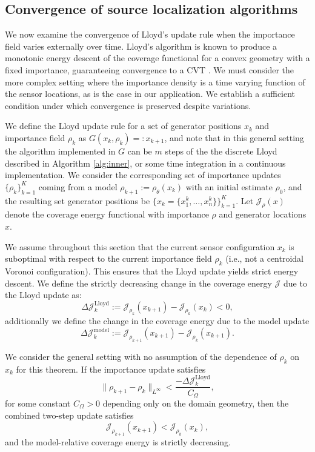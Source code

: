 \documentclass[onefignum,onetabnum]{siamart171218} %
\begin{document}
\subsection{Convergence of source localization algorithms}
\label{sec:methodology_convergence}

We now examine the convergence of Lloyd’s update rule when the importance field varies externally over time. Lloyd's algorithm is known to produce a monotonic energy descent of the coverage functional for a convex geometry with a fixed importance, guaranteeing convergence to a CVT \cite{cortes2004coverage}. We must consider the more complex setting where the importance density is a time varying function of the sensor locations, as is the case in our application. We establish a sufficient condition under which convergence is preserved despite variations.

We define the Lloyd update rule for a set of generator positions $x_k$ and importance field $\rho_k$ as $G(x_k, \rho_k) =: x_{k+1}$, and note that in this general setting the algorithm implemented in $G$ can be $m$ steps of the the discrete Lloyd described in Algorithm \ref{alg:inner}, or some time integration in a continuous implementation. We consider the corresponding set of importance updates $\{\rho_k\}_{k=1}^K$ coming from a model $\rho_{k+1}:=\rho_\theta(x_{k})$ with an initial estimate $\rho_0$, and the resulting set generator positions be $\{x_k = \{x_1^k, \ldots, x_n^k\}\}_{k=1}^K$. Let $\mathcal{J}_{\rho}(x)$ denote the coverage energy functional with importance $\rho$ and generator locations $x$.

We assume throughout this section that the current sensor configuration \( x_k \) is suboptimal with respect to the current importance field \( \rho_k \) (i.e., not a centroidal Voronoi configuration). This ensures that the Lloyd update yields strict energy descent.
We define the strictly decreasing change in the coverage energy $\mathcal{J}$ due to the Lloyd update as:
\[
    \Delta \mathcal{J}_k^{\mathrm{Lloyd}} := \mathcal{J}_{\rho_k}(x_{k+1}) - \mathcal{J}_{\rho_k}(x_{k}) < 0,
\]
additionally we define the change in the coverage energy due to the model update
\[
    \Delta \mathcal{J}_k^{\mathrm{model}} := \mathcal{J}_{\rho_{k+1}}(x_{k+1}) - \mathcal{J}_{\rho_k}(x_{k+1}).
\]

\begin{theorem}
\label{thm:1}
We consider the general setting with no assumption of the dependence of $\rho_k$ on $x_k$ for this theorem. 
If the importance update satisfies
\[
    \label{eq:theorem1_condition}
    \|\rho_{k+1} - \rho_k\|_{L^\infty} < \frac{-\Delta \mathcal{J}_k^{\mathrm{Lloyd}}}{C_\Omega},
\]
for some constant \( C_\Omega > 0 \) depending only on the domain geometry, then the combined two-step update satisfies
\[
    \mathcal{J}_{\rho_{k+1}}(x_{k+1}) < \mathcal{J}_{\rho_k}(x_k),
\]
and the model-relative coverage energy is strictly decreasing.
\end{theorem}
\end{document}
